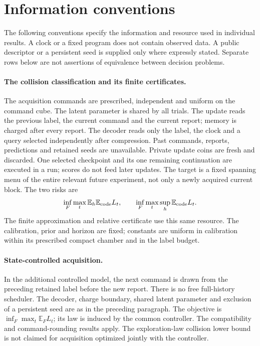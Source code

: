 \section{Information conventions}
\label{sec:v32-ledger}
The following conventions specify the information and resource used in
individual results. A clock or a fixed program does not contain observed
data. A public descriptor or a persistent seed is supplied only where
expressly stated. Separate rows below are not assertions of equivalence
between decision problems.

\paragraph{The collision classification and its finite certificates.}
The acquisition commands are prescribed, independent and uniform on the
command cube. The latent parameter is shared by all trials. The update
reads the previous label, the current command and the current report;
memory is charged after every report. The decoder reads only the label,
the clock and a query selected independently after compression. Past
commands, reports, predictions and retained seeds are unavailable.
Private update coins are fresh and discarded. One selected checkpoint and
its one remaining continuation are executed in a run; scores do not feed
later updates. The target is a fixed spanning menu of the entire relevant
future experiment, not only a newly acquired current block. The two risks
are
\[
 \inf_F\max_t\mathbb E_h\mathbb E_{\rm code} L_t,
 \qquad
 \inf_F\max_t\sup_h\mathbb E_{\rm code} L_t.
\]
The finite approximation and relative certificate use this same resource.
The calibration, prior and horizon are fixed; constants are uniform in
calibration within its prescribed compact chamber and in the label budget.

\paragraph{State-controlled acquisition.}
In the additional controlled model, the next command is drawn from the
preceding retained label before the new report. There is no free
full-history scheduler. The decoder, charge boundary, shared latent
parameter and exclusion of a persistent seed are as in the preceding
paragraph. The objective is $\inf_F\max_t\mathbb E_F L_t$; its law is
induced by the common controller. The compatibility and command-rounding
results apply. The exploration-law collision lower bound is not claimed
for acquisition optimized jointly with the controller.


